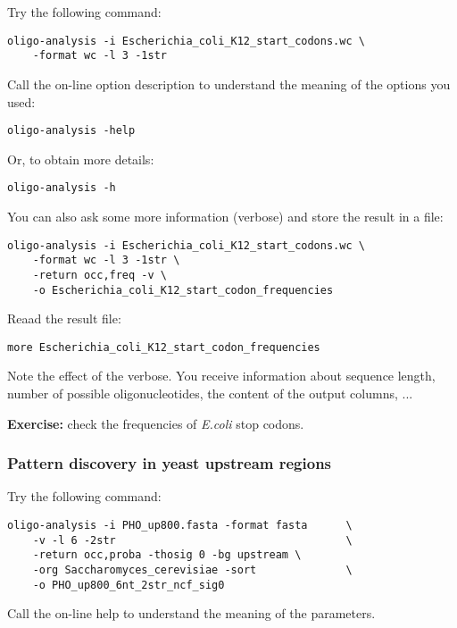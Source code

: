 Try the following command:

\begin{verbatim}
oligo-analysis -i Escherichia_coli_K12_start_codons.wc \
    -format wc -l 3 -1str
\end{verbatim}

Call the on-line option description to understand the meaning of the options you used:
\begin{verbatim}
oligo-analysis -help
\end{verbatim}

Or, to obtain more details:
\begin{verbatim}
oligo-analysis -h
\end{verbatim}


You can also ask some more information (verbose) and store the result
in a file:

\begin{verbatim}
oligo-analysis -i Escherichia_coli_K12_start_codons.wc \
    -format wc -l 3 -1str \
    -return occ,freq -v \
    -o Escherichia_coli_K12_start_codon_frequencies
\end{verbatim}

Reaad the result file:

\begin{verbatim}
more Escherichia_coli_K12_start_codon_frequencies
\end{verbatim}

Note the effect of the verbose. You receive information about sequence
length, number of possible oligonucleotides, the content of the output
columns, ...

\textbf{Exercise:} check the frequencies of \textit{E.coli} stop codons.

\subsubsection{Pattern discovery in yeast upstream regions}

Try the following command:

\begin{verbatim} 
oligo-analysis -i PHO_up800.fasta -format fasta      \
    -v -l 6 -2str                                    \
    -return occ,proba -thosig 0 -bg upstream \
    -org Saccharomyces_cerevisiae -sort              \
    -o PHO_up800_6nt_2str_ncf_sig0 
\end{verbatim}

Call the on-line help to understand the meaning of the parameters.

